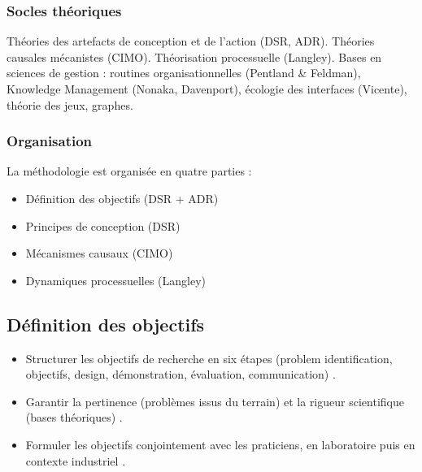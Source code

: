\documentclass[a4paper,12pt]{article}
\begin{document}
\subsubsection{Socles théoriques}
\label{sec:orgae42aaa}
Théories des artefacts de conception et de l’action (DSR, ADR).
Théories causales mécanistes (CIMO).
Théorisation processuelle (Langley).
Bases en sciences de gestion : routines organisationnelles (Pentland \& Feldman), Knowledge Management (Nonaka, Davenport), écologie des interfaces (Vicente), théorie des jeux, graphes.
\subsubsection{Organisation}
\label{sec:org10ea83a}
La méthodologie est organisée en quatre parties :
\begin{itemize}
\item Définition des objectifs (DSR + ADR)
\item Principes de conception (DSR)
\item Mécanismes causaux (CIMO)
\item Dynamiques processuelles (Langley)
\end{itemize}
\subsection{Définition des objectifs}
\label{sec:org7d02835}
\begin{itemize}
\item Structurer les objectifs de recherche en six étapes (problem identification, objectifs, design, démonstration, évaluation, communication) \autocite[et al. (2007)]{Peffers}.
\item Garantir la pertinence (problèmes issus du terrain) et la rigueur scientifique (bases théoriques) \autocite[et al. (2004)]{Hevner}.
\item Formuler les objectifs conjointement avec les praticiens, en laboratoire puis en contexte industriel \autocite[et al. (2011) (ADR)]{Sein}.
\end{itemize}
\end{document}
